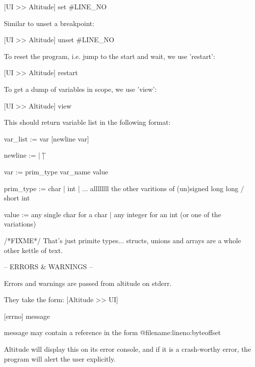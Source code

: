 \documentclass[10pt,a4paper]{report}
\begin{document}
[UI >> Altitude]
set #LINE_NO

Similar to unset a breakpoint:

[UI >> Altitude]
unset #LINE_NO

To reset the program, i.e. jump to the start and wait, we use 'restart':

[UI >> Altitude]
restart

To get a dump of variables in scope, we use 'view':

[UI >> Altitude]
view

This should return variable list in the following format:

var_list := var [newline var]

newline := \n | \r | \r\n

var := prim_type var_name value

prim_type := char | int | ... allllllll the other varitions of (un)signed long long / short int

value := any single char for a char | any integer for an int (or one of the variations)

/*FIXME*/ That's just primite types... structs, unions and arrays are a whole other kettle of text.

-- ERRORS & WARNINGS --

Errors and warnings are passed from altitude on stderr.

They take the form:
[Altitude >> UI]

[errno] message

message may contain a reference in the form @filename:lineno:byteoffset

Altitude will display this on its error console, and if it is a crash-worthy error, the program will alert the user explicitly.
\end{document}
